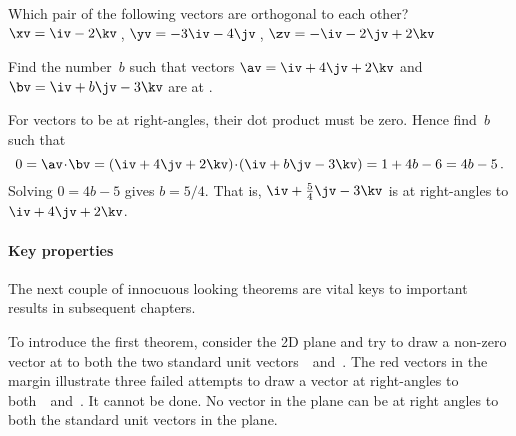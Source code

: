 \begin{activity}
Which pair of the following vectors are orthogonal to each other?
\(\xv=\iv-2\kv\)\,, \(\yv=-3\iv-4\jv\)\,, \(\zv=-\iv-2\jv+2\kv\)
\end{activity}



\begin{example} \label{eg:}
Find the number~\(b\) such that vectors \(\av=\iv+4\jv+2\kv\) and \(\bv=\iv+b\jv-3\kv\) are at .
\begin{solution} 
For vectors to be at right-angles, their dot product must be zero.
Hence find~\(b\) such that
\begin{equation*}
0=\av\cdot\bv=(\iv+4\jv+2\kv)\cdot(\iv+b\jv-3\kv)
=1+4b-6=4b-5\,.
\end{equation*}
Solving \(0=4b-5\) gives \(b=5/4\).
That is, \(\iv+\tfrac54\jv-3\kv\) is at right-angles to \(\iv+4\jv+2\kv\).
\end{solution}
\end{example}



\paragraph{Key properties}
The next couple of innocuous looking theorems are vital keys to important results in subsequent chapters.

To introduce the first theorem, consider the 2D plane and try to draw a non-zero vector at  to both the two standard unit vectors~\iv\ and~\jv.
%
The red vectors in the margin illustrate three failed attempts to draw a vector at right-angles to both~\iv\ and~\jv.
It cannot be done. 
No vector in the plane can be at right angles to both the standard unit vectors in the plane.


